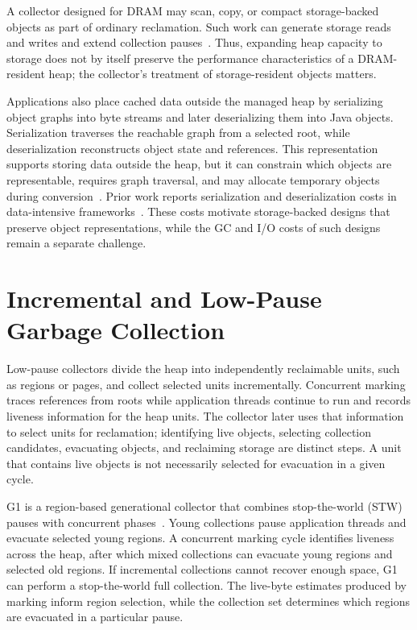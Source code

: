 A collector designed for DRAM may scan, copy, or compact storage-backed objects as part of ordinary reclamation.
Such work can generate storage reads and writes and extend collection pauses~\cite{nvm-gc-eurosys}.
Thus, expanding heap capacity to storage does not by itself preserve the performance characteristics of a DRAM-resident heap; the collector's treatment of storage-resident objects matters.

Applications also place cached data outside the managed heap by serializing object graphs into byte streams and later deserializing them into Java objects.
Serialization traverses the reachable graph from a selected root, while deserialization reconstructs object state and references.
This representation supports storing data outside the heap, but it can constrain which objects are representable, requires graph traversal, and may allocate temporary objects during conversion~\cite{grochowski2019serialization, niemeyer2005learning, harold2006java}.
Prior work reports serialization and deserialization costs in data-intensive frameworks~\cite{navasca:gerenuk, nguyen:skyway, matei:champions, taranov:naos}.
These costs motivate storage-backed designs that preserve object representations, while the GC and I/O costs of such designs remain a separate challenge.

\section{Incremental and Low-Pause Garbage Collection}

Low-pause collectors divide the heap into independently reclaimable units, such as regions or pages, and collect selected units incrementally.
Concurrent marking traces references from roots while application threads continue to run and records liveness information for the heap units.
The collector later uses that information to select units for reclamation; identifying live objects, selecting collection candidates, evacuating objects, and reclaiming storage are distinct steps.
A unit that contains live objects is not necessarily selected for evacuation in a given cycle.

G1 is a region-based generational collector that combines stop-the-world (STW) pauses with concurrent phases~\cite{detlefs:g1}.
Young collections pause application threads and evacuate selected young regions.
A concurrent marking cycle identifies liveness across the heap, after which mixed collections can evacuate young regions and selected old regions.
If incremental collections cannot recover enough space, G1 can perform a stop-the-world full collection.
The live-byte estimates produced by marking inform region selection, while the collection set determines which regions are evacuated in a particular pause.

